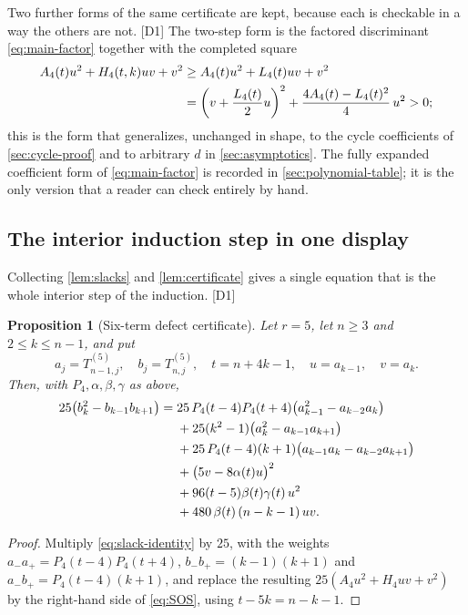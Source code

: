 \documentclass[11pt,a4paper]{article}
\numberwithin{equation}{section}
\newtheorem{proposition}[proposition]{Proposition}
\theoremstyle{definition}
\theoremstyle{remark}
\newcommand{\dup}[1]{{\small\textsf{\color{MutedInk}[#1]}}}
\begin{document}
Two further forms of the same certificate are kept, because each is
checkable in a way the others are not. \dup{D1} The two-step form is the
factored discriminant \eqref{eq:main-factor} together with the completed
square
\begin{align}
 A_4(t)u^2+H_4(t,k)uv+v^2
 &\ge A_4(t)u^2+L_4(t)uv+v^2\notag\\
 &=\left(v+\frac{L_4(t)}2u\right)^2
       +\frac{4A_4(t)-L_4(t)^2}{4}\,u^2
 >0;\label{eq:hard-square}
\end{align}
this is the form that generalizes, unchanged in shape, to the cycle
coefficients of \cref{sec:cycle-proof} and to arbitrary $d$ in
\cref{sec:asymptotics}. The fully expanded coefficient form of
\eqref{eq:main-factor} is recorded in \cref{sec:polynomial-table}; it is
the only version that a reader can check entirely by hand.

\subsection{The interior induction step in one display}

Collecting \cref{lem:slacks} and \cref{lem:certificate} gives a single
equation that is the whole interior step of the induction. \dup{D1}

\begin{proposition}[Six-term defect certificate]\label{prop:full}
Let $r=5$, let $n\ge3$ and $2\le k\le n-1$, and put
\[
 a_j=T^{(5)}_{n-1,j},\quad b_j=T^{(5)}_{n,j},\quad
 t=n+4k-1,\quad u=a_{k-1},\quad v=a_k .
\]
Then, with $P_4,\alpha,\beta,\gamma$ as above,
\begin{align}
 25\bigl(b_k^2-b_{k-1}b_{k+1}\bigr)
 ={}&25\,P_4(t-4)P_4(t+4)\bigl(a_{k-1}^2-a_{k-2}a_k\bigr)\notag\\
 &+25(k^2-1)\bigl(a_k^2-a_{k-1}a_{k+1}\bigr)\notag\\
 &+25\,P_4(t-4)(k+1)\bigl(a_{k-1}a_k-a_{k-2}a_{k+1}\bigr)\notag\\
 &+\bigl(5v-8\alpha(t)u\bigr)^2\notag\\
 &+96(t-5)\beta(t)\gamma(t)\,u^2\notag\\
 &+480\,\beta(t)\,(n-k-1)\,uv.\label{eq:full-certificate}
\end{align}
\end{proposition}
\begin{proof}
Multiply \eqref{eq:slack-identity} by $25$, with the weights
$a_-a_+=P_4(t-4)P_4(t+4)$, $b_-b_+=(k-1)(k+1)$ and
$a_-b_+=P_4(t-4)(k+1)$, and replace the resulting
$25(A_4u^2+H_4uv+v^2)$ by the right-hand side of \eqref{eq:SOS}, using
$t-5k=n-k-1$.
\end{proof}
\end{document}
